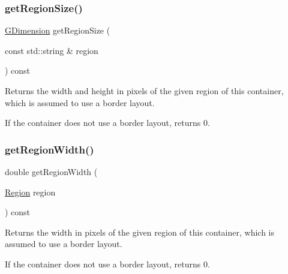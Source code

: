 \subsubsection{\texorpdfstring{get\+Region\+Size()}{getRegionSize()}\hspace{0.1cm}{\footnotesize\ttfamily [2/2]}}
{\footnotesize\ttfamily \mbox{\hyperlink{structsgl_1_1GDimension}{G\+Dimension}} get\+Region\+Size (\begin{DoxyParamCaption}\item[{const std\+::string \&}]{region }\end{DoxyParamCaption}) const\hspace{0.3cm}{\ttfamily [virtual]}}



Returns the width and height in pixels of the given region of this container, which is assumed to use a border layout. 

If the container does not use a border layout, returns 0. \mbox{\label{classsgl_1_1GContainer_a96e2005c3f447a8679c3c32d3fc02de1}} 
\subsubsection{\texorpdfstring{get\+Region\+Width()}{getRegionWidth()}\hspace{0.1cm}{\footnotesize\ttfamily [1/2]}}
{\footnotesize\ttfamily double get\+Region\+Width (\begin{DoxyParamCaption}\item[{\mbox{\hyperlink{classsgl_1_1GContainer_a81a01a86de31071a92e6cce0bab9bc4b}{Region}}}]{region }\end{DoxyParamCaption}) const\hspace{0.3cm}{\ttfamily [virtual]}}



Returns the width in pixels of the given region of this container, which is assumed to use a border layout. 

If the container does not use a border layout, returns 0. \mbox{\label{classsgl_1_1GContainer_ab169dab454fc90f1c845b91b4e1a8a14}} 
